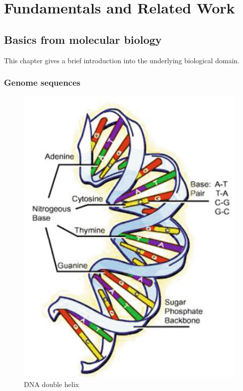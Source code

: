 \section{Fundamentals and Related Work} \label{fundamentals}

\subsection{Basics from molecular biology} \label{fundamentalsA0}

This chapter gives a brief introduction into the underlying biological domain.

\subsubsection{Genome sequences} \label{fundamentalsA0a}

\begin{figure}
	\centering
	\includegraphics[width=0.9\linewidth]{figures/dnaDoubleHelix.png}
	\caption{\ac{DNA} double helix \cite[p. 8]{10.5555/1965281}}
	\label{dna_double_helix}
\end{figure}

